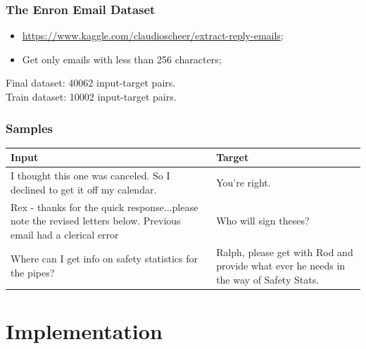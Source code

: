 \documentclass{beamer}
\begin{document}
\begin{frame}
  \frametitle{The Enron Email Dataset}

  \begin{itemize}
    \item \href{https://www.kaggle.com/claudioscheer/extract-reply-emails}{https://www.kaggle.com/claudioscheer/extract-reply-emails};
    \item Get only emails with less than 256 characters;
  \end{itemize}

  \bigbreak
  \bigbreak
  \bigbreak

  Final dataset: \num{40062} input-target pairs.
  \\
  Train dataset: \num{10002} input-target pairs.
\end{frame}

\begin{frame}
  \frametitle{Samples}

  \begin{table}
    \centering
    \begin{tabularx}{\textwidth}{|X|X|}
      \hline
      \textbf{Input}                                                            & \textbf{Target}                                                                       \\
      \hline
      I thought this one was canceled. So I declined to get it off my calendar. & You're right.                                                                         \\
      \hline
      Rex - thanks for the quick response...please note the revised letters below.
      Previous email had a clerical error                                       & Who will sign theses?                                                                 \\
      \hline
      Where can I get info on safety statistics for the pipes?                  & Ralph, please get with Rod and provide what ever he needs in the way of Safety Stats. \\
      \hline
    \end{tabularx}
  \end{table}
\end{frame}


\section{Implementation}
\end{document}
